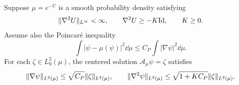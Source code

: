 \documentclass[11pt,reqno]{amsart}
\numberwithin{equation}{section}
\theoremstyle{plain}
\theoremstyle{remark}
\DeclarePairedDelimiter{\norm}{\lVert}{\rVert}
\newcommand{\Aop}{\mathcal A}
\newcommand{\Id}{\mathrm{Id}}
\begin{document}
\begin{lemma}\label{lem:weighted-elliptic}
Suppose $\mu=e^{-U}$ is a smooth probability density satisfying
\begin{equation}\label{eq:elliptic-density-hypotheses}
 \norm{\nabla^2U}_{L^\infty}<\infty,\qquad
 \nabla^2U\ge-K\Id,\qquad K\ge0.
\end{equation}
Assume also the Poincar\'e inequality
\begin{equation}\label{eq:one-body-PI}
 \int|\psi-\mu(\psi)|^2\dd\mu\le C_P\int|\nabla\psi|^2\dd\mu.
\end{equation}
For each $\zeta\in L^2_0(\mu)$, the centered solution $\Aop_\mu\psi=\zeta$ satisfies
\begin{equation}\label{eq:weighted-elliptic-estimate}
 \norm{\nabla\psi}_{L^2(\mu)}\le\sqrt{C_P}\norm\zeta_{L^2(\mu)},
 \qquad
 \norm{\nabla^2\psi}_{L^2(\mu)}\le\sqrt{1+KC_P}\norm\zeta_{L^2(\mu)}.
\end{equation}
\end{lemma}
\end{document}
